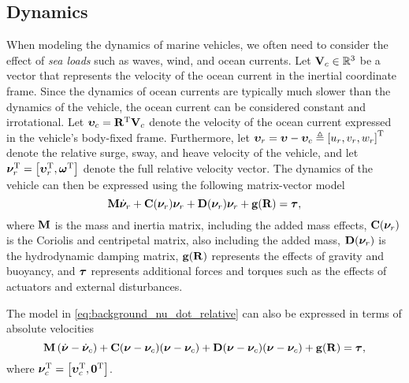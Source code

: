 \subsection{Dynamics}
When modeling the dynamics of marine vehicles, we often need to consider the effect of \emph{sea loads} such as waves, wind, and ocean currents.
Let $\mathbf{V}_c \in \mathbb{R}^3$ be a vector that represents the velocity of the ocean current in the inertial coordinate frame.
Since the dynamics of ocean currents are typically much slower than the dynamics of the vehicle, the ocean current can be considered constant and irrotational.
Let $\bm{\upsilon}_c = \mathbf{R}^{\mathrm{T}} \mathbf{V}_c$ denote the velocity of the ocean current expressed in the vehicle's body-fixed frame.
Furthermore, let $\bm{\upsilon}_r = \bm{\upsilon} - \bm{\upsilon}_c \triangleq \left[u_r, v_r, w_r\right]^{\mathrm{T}}$ denote the relative surge, sway, and heave velocity of the vehicle, and let $\bm{\nu}_r^{\mathrm{T}} = \left[\bm{\upsilon}_r^{\mathrm{T}}, \bm{\omega}^{\mathrm{T}}\right]$ denote the full relative velocity vector.
The dynamics of the vehicle can then be expressed using the following matrix-vector model \cite{fossen_handbook_2011}
\begin{equation}
    \mathbf{M} \dot{\bm{\nu}}_r + \mathbf{C}(\bm{\nu}_r)\bm{\nu}_r + \mathbf{D}(\bm{\nu}_r)\bm{\nu}_r + \mathbf{g}(\mathbf{R}) = \bm{\tau},
    \label{eq:background_nu_dot_relative}
\end{equation}
where $\mathbf{M}$ is the mass and inertia matrix, including the added mass effects, $\mathbf{C}(\bm{\nu}_r)$ is the Coriolis and centripetal matrix, also including the added mass, $\mathbf{D}(\bm{\nu}_r)$ is the hydrodynamic damping matrix, $\mathbf{g}(\mathbf{R})$ represents the effects of gravity and buoyancy, and $\bm{\tau}$ represents additional forces and torques such as the effects of actuators and external disturbances.

The model in \eqref{eq:background_nu_dot_relative} can also be expressed in terms of absolute velocities
\begin{equation}
    \mathbf{M} \left(\dot{\bm{\nu}} - \dot{\bm{\nu}}_c\right) + \mathbf{C}(\bm{\nu} - \bm{\nu}_c)(\bm{\nu} - \bm{\nu}_c) + \mathbf{D}(\bm{\nu} - \bm{\nu}_c)(\bm{\nu} - \bm{\nu}_c) + \mathbf{g}(\mathbf{R}) = \bm{\tau},
\end{equation}
where $\bm{\nu}_c^{\mathrm{T}} = \left[\bm{\upsilon}_c^{\mathrm{T}}, \mathbf{0}^{\mathrm{T}}\right]$.

